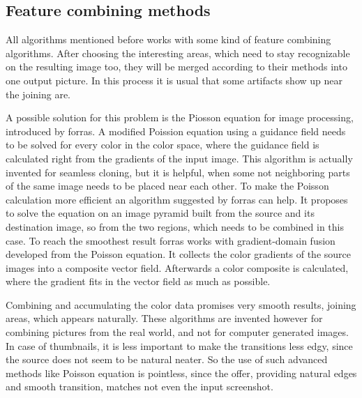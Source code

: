\documentclass[draft,final]{vutinfth} %
\begin{document}
	\subsection{Feature combining methods}
	All algorithms mentioned before works with some kind of feature combining algorithms.
	After choosing the interesting areas, which need to stay recognizable on the resulting image too, they will be merged according to their methods into one output picture.
	In this process it is usual that some artifacts show up near the joining are.\par 
	A possible solution for this problem is the Piosson equation for image processing, introduced by forras.
	A modified Poission equation using a guidance field needs to be solved for every color in the color space, where the guidance field is calculated right from the gradients of the input image.
	This algorithm is actually invented for seamless cloning, but it is helpful, when some not neighboring parts of the same image needs to be placed near each other.
	To make the Poisson calculation more efficient an algorithm suggested by forras can help.
	It proposes to solve the equation on an image pyramid built from the source and its destination image, so from the two regions, which needs to be combined in this case.
	To reach the smoothest result forras works with gradient-domain fusion developed from the Poisson equation.
	It collects the color gradients of the source images into a composite vector field.
	Afterwards  a color composite is calculated, where the gradient fits in the vector field as much as possible. \par 
	Combining and accumulating the color data promises very smooth results, joining areas, which appears naturally.
	These algorithms are invented however for combining pictures from the real world, and not for computer generated images.
	In case of thumbnails, it is less important to make the transitions less edgy, since the source does not seem to be natural neater. 
	So the use of such advanced methods like Poisson equation is pointless, since the offer, providing natural edges and smooth transition, matches not even the input screenshot. 
	
	
	
\end{document}
